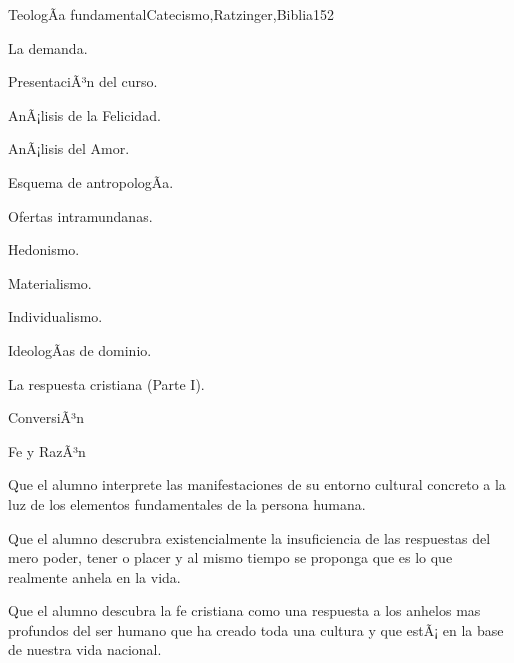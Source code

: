 \begin{syllabus}
\begin{unit}{TeologÃ­a fundamental}{Catecismo,Ratzinger,Biblia}{15}{2}
\begin{topics}
	\item La demanda. 
	      \begin{inparaenum}
		    \item PresentaciÃ³n del curso.
		    \item AnÃ¡lisis de la Felicidad.
		    \item AnÃ¡lisis del Amor.
		    \item Esquema de antropologÃ­a.
	      \end{inparaenum}
	\item Ofertas intramundanas. 
	      \begin{inparaenum}
		    \item Hedonismo.
		    \item Materialismo.
		    \item Individualismo.
		    \item IdeologÃ­as de dominio.
	      \end{inparaenum}
	\item La respuesta cristiana (Parte I). 
	      \begin{inparaenum}
		    \item ConversiÃ³n
		    \item Fe y RazÃ³n
	      \end{inparaenum}
\end{topics}
\begin{unitgoals}
	\item Que el alumno interprete las manifestaciones de su entorno cultural concreto a la luz de los elementos fundamentales de la persona humana.
	\item Que el alumno descrubra existencialmente la insuficiencia de las respuestas del mero poder, tener o placer y al mismo tiempo se proponga que es lo que realmente anhela en la vida.
	\item Que el alumno descubra la fe cristiana como una respuesta a los anhelos mas profundos del ser humano que ha creado toda una cultura y que estÃ¡ en la base de nuestra vida nacional.
\end{unitgoals}
\end{unit}


\end{syllabus}
